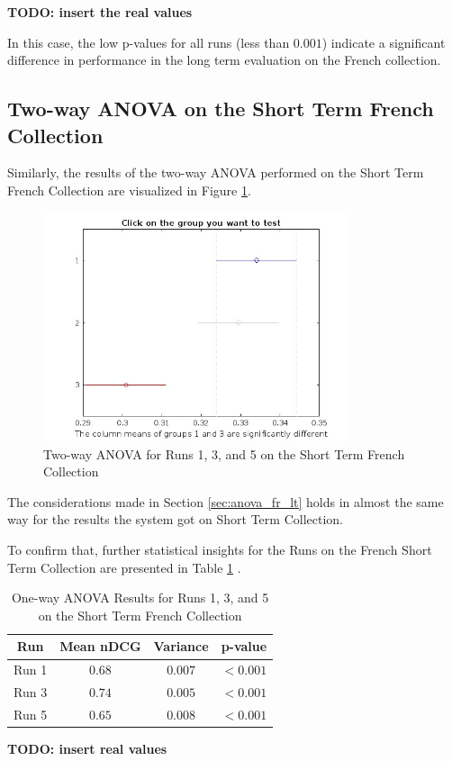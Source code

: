 \begin{center}
    \textbf{TODO: insert the real values}
\end{center}
 
In this case, the low p-values for all runs (less than $0.001$) indicate a significant difference in performance in the long term evaluation on the French collection.

\newpage
\subsection{Two-way ANOVA on the Short Term French Collection}

Similarly, the results of the two-way \ac{ANOVA} performed on the Short Term French Collection are visualized in Figure \ref{fig:st_anova_french}. 

\begin{figure}[!h]
\centering
\includegraphics[width=0.8\textwidth]{figure/StatisticalAnalysis/AnovaTwoWay/ST_FR.jpg}
\caption{Two-way \ac{ANOVA} for Runs 1, 3, and 5 on the Short Term French Collection}
\label{fig:st_anova_french}
\end{figure}

The considerations made in Section \ref{sec:anova_fr_lt} holds in almost the same way for the results the system got on Short Term Collection.  

To confirm that, further statistical insights for the Runs on the French Short Term Collection are presented in Table \ref{table:st_anova_french} .

\begin{table}[!h]
\centering
\caption{One-way \ac{ANOVA} Results for Runs 1, 3, and 5 on the Short Term French Collection}
\label{table:st_anova_french}
\begin{tabular}{cccc}
\toprule
\textbf{Run} & \textbf{Mean nDCG} & \textbf{Variance} & \textbf{p-value} \\
\midrule
Run 1 & $0.68$ & $0.007$ & $<0.001$ \\
Run 3 & $0.74$ & $0.005$ & $<0.001$ \\
Run 5 & $0.65$ & $0.008$ & $<0.001$ \\
\bottomrule
\end{tabular}
\end{table}
\begin{center}
    \textbf{TODO: insert real values}
\end{center}

